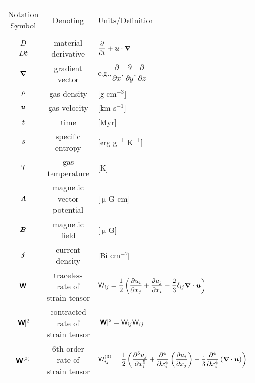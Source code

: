 \documentclass[preprint2]{aastex63}
\newcommand{\vect}[1]{{{\mbox{\boldmath $#1$}}}}%
\newcommand{\mathbfss}[1]{\textbf{\textsf{#1}}}
\begin{document}
\begin{table*}[h]
\begin{tabular}{ccl}
\hline\hline\\
{Notation Symbol} & {Denoting} & {Units/Definition}\\\hline\\
 $\dfrac{D}{Dt}$ & material derivative & $\dfrac{\partial }{\partial t}+\vect{u}\cdot \vect\nabla$ \\
 $\vect\nabla$ & gradient vector & e.g.,$\dfrac{\partial }{\partial x},\dfrac{\partial }{\partial y},\dfrac{\partial }{\partial z}$ \\
 $\rho$ & gas density & [g cm$^{-3}$]  \\
 $\vect u$ & gas velocity & [km s$^{-1}$] \\
 $t$ & time & [Myr] \\
 $s$ & specific entropy & [erg g$^{-1}$ K$^{-1}$] \\
 $T$ & gas temperature & [K] \\
 $\vect A$ & magnetic vector potential & [$\upmu$G cm] \\
 $\vect B$ & magnetic field & [$\upmu$G] \\
 $\vect j$ & current density & [Bi cm$^{-2}$] \\
 $\mathbfss W$ & traceless rate of strain tensor &
   ${\mathsf W}_{ij} = \dfrac{1}{2}\left(\dfrac{\partial u_i}{\partial x_j}
                  + \dfrac{\partial u_j}{\partial x_i}
                  -\dfrac{2}{3} \delta_{ij}\vect\nabla\cdot \vect u\right)$ \\
 $|\mathbfss W|^2$ & contracted rate of strain tensor &
   $|\mathbfss W|^2={\mathsf W}_{ij}{\mathsf W}_{ij}$\\
 $\mathbfss W^{(3)}$ & 6th order rate of strain tensor &
   ${\mathsf W}_{ij}^{(3)} = \dfrac{1}{2}\left(\dfrac{\partial^5 u_j}{\partial x_i^5}
                  + \dfrac{\partial^4}{\partial x_i^4}\left(\dfrac{\partial u_i}{\partial x_j}\right)
                  -\dfrac{1}{3}\dfrac{\partial^4}{\partial x_i^4}\left(\vect\nabla\cdot \vect u\right)\right)$ \\

\end{tabular}
\end{table*}
\end{document}
